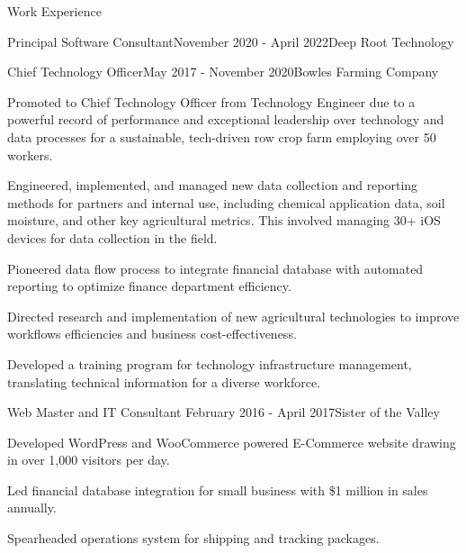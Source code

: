 \documentclass{resume} %
\begin{document}
\begin{rSection}{Work Experience}
\begin{rSubsection}{Principal Software Consultant}{November 2020 - April 2022}{Deep Root Technology}{}
\end{rSubsection}


\begin{rSubsection}{Chief Technology Officer}{May 2017 - November 2020}{Bowles Farming Company}{}
    \item Promoted to Chief Technology Officer from Technology Engineer due to a powerful record of performance and exceptional leadership over technology and data processes for a sustainable, tech-driven row crop farm employing over 50 workers. 
    \item Engineered, implemented, and managed new data collection and reporting methods for partners and internal use, including chemical application data, soil moisture, and other key agricultural metrics. This involved managing 30+ iOS devices for data collection in the field.
    \item Pioneered data flow process to integrate financial database with automated reporting to optimize finance department efficiency.
    \item Directed research and implementation of new agricultural technologies to improve workflows efficiencies and business cost-effectiveness.
    \item Developed a training program for technology infrastructure management, translating technical information for a diverse workforce.
   \end{rSubsection}



   \begin{rSubsection}{Web Master and IT Consultant }{February 2016 - April 2017}{Sister of the Valley}{}
    \item Developed WordPress and WooCommerce powered E-Commerce website drawing in over 1,000 visitors per day. 
    \item Led financial database integration for small business with \$1 million in sales annually.
    \item Spearheaded operations system for shipping and tracking packages. 
   \end{rSubsection}

\end{rSection}
\end{document}
